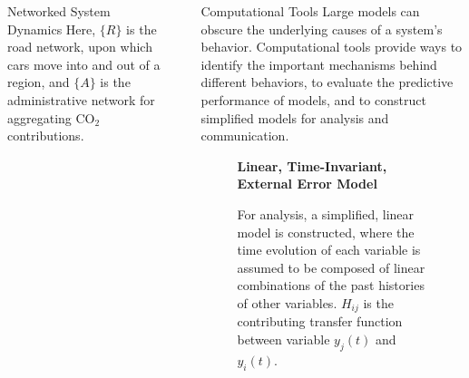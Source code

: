 \documentclass[final]{beamer}
\newlength{\sepwid}
\newlength{\onecolwid}
\newlength{\twocolwid}
\begin{document}
\begin{frame}[fragile]
\begin{columns}[t]
\begin{column}{\twocolwid}
\begin{columns}[t]
\begin{column}{\onecolwid}
\begin{alertblock}{Networked System Dynamics}
        Here, $\{R\}$ is the road network, upon which cars move into and
        out of a region, and $\{A\}$ is the administrative network for
        aggregating CO$_2$ contributions.

      \end{alertblock}

    \end{column}

    \begin{column}{0\sepwid}\end{column}			%
      
    \begin{column}{\onecolwid}
      \begin{alertblock}{Computational Tools}
        Large models can obscure the underlying causes of a system's
        behavior.  Computational tools provide ways to identify the
        important mechanisms behind different behaviors, to evaluate
        the predictive performance of models, and to construct
        simplified models for analysis and communication.

        \begin{figure}[h]
          {\bf Linear, Time-Invariant, External Error Model}
          
          \vspace{.1cm}
          \caption*{For analysis, a simplified, linear model is
            constructed, where the time evolution of each variable is
            assumed to be composed of linear combinations of the past
            histories of other variables.  $H_{ij}$ is the
            contributing transfer function between variable $y_j(t)$
            and $y_i(t)$.}
        \end{figure}


\end{alertblock}
\end{column}
\end{columns}
\end{column}
\end{columns}
\end{frame}
\end{document}
